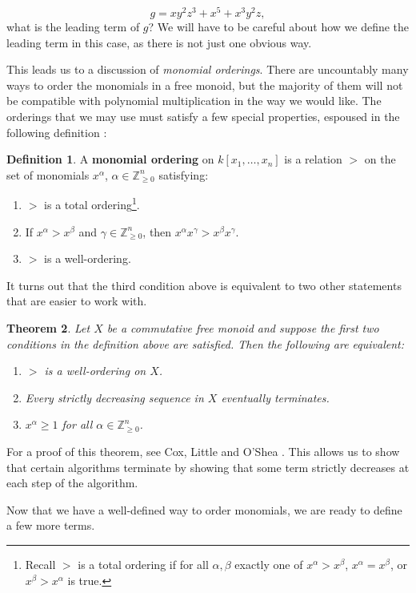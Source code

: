 \documentclass[MS, xcolor=dvipsnames]{wfuthesis}
\def\bZ{\mathbb{Z}}
\newtheorem{theorem}{Theorem}
\theoremstyle{definition}
\newtheorem{definition}[theorem]{Definition}
\begin{document}
\[ g = xy^2z^3 + x^5 + x^3y^2z, \]
what is the leading term of $g$? We will have to be careful about how we define the leading term in this case, as there is not just one obvious way. \par 
This leads us to a discussion of \textit{monomial orderings}. There are uncountably many ways to order the monomials in a free monoid, but the majority of them will not be compatible with polynomial multiplication in the way we would like. The orderings that we may use must satisfy a few special properties, espoused in the following definition \cite{Cox2015}:
\begin{definition}
  A \textbf{monomial ordering} on $k[x_1,\dots,x_n]$ is a relation $>$ on the set of monomials $x^\alpha$, $\alpha \in \bZ_{\ge0}^n$ satisfying:
  \begin{enumerate}[label=(\roman*)]
    \item $>$ is a total ordering\footnote{Recall $>$ is a total ordering if for all $\alpha,\beta$ exactly one of $x^\alpha > x^\beta$, $x^\alpha = x^\beta$, or $x^\beta > x^\alpha$ is true.}. 
    \item If $x^\alpha > x^\beta$ and $\gamma \in \bZ_{\ge0}^n$, then $x^\alpha x^\gamma > x^\beta x^\gamma$. 
    \item $>$ is a well-ordering. 
  \end{enumerate}
\end{definition}
It turns out that the third condition above is equivalent to two other statements that are easier to work with. 
\begin{theorem}
  Let $X$ be a commutative free monoid and suppose the first two conditions in the definition above are satisfied. Then the following are equivalent: 
  \begin{enumerate}
    \item $>$ is a well-ordering on $X$. 
    \item Every strictly decreasing sequence in $X$ eventually terminates. 
    \item $x^\alpha\ge1$ for all $\alpha \in \bZ_{\ge0}^n$. 
  \end{enumerate}
\end{theorem}
For a proof of this theorem, see Cox, Little and O'Shea \cite{Cox2015}. This allows us to show that certain algorithms terminate by showing that some term strictly decreases at each step of the algorithm. \par 
Now that we have a well-defined way to order monomials, we are ready to define a few more terms.
\end{document}

